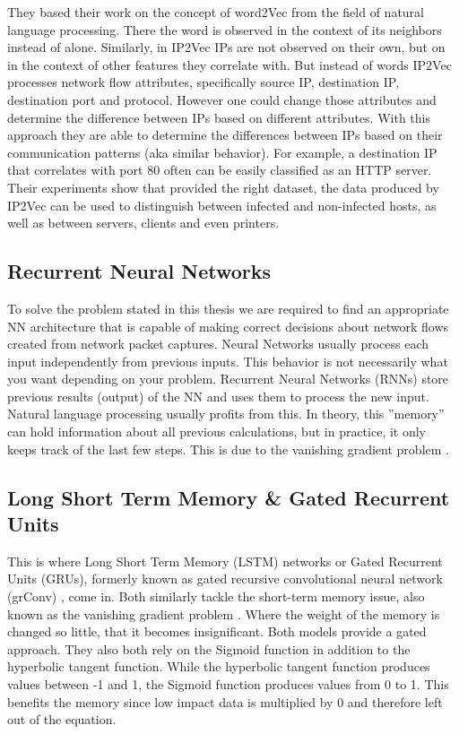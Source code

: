 \documentclass[
	ngerman,
	ruledheaders=section,%
	class=report,%
	thesis={type=bachelor},%
	accentcolor=9c,%
	custommargins=true,%
	marginpar=false,%
	parskip=half-,%
	fontsize=11pt,%
]{tudapub}
\begin{document}
They based their work on the concept of word2Vec from the field of natural language processing.
There the word is observed in the context of its neighbors instead of alone.
Similarly, in IP2Vec IPs are not observed on their own, but on in the context of other features they correlate with.
But instead of words IP2Vec processes network flow attributes,
specifically source IP, destination IP, destination port and protocol.
However one could change those attributes and determine the difference between IPs based on different attributes.
With this approach they are able to determine the differences between IPs based on their communication patterns (aka similar behavior).
For example, a destination IP that correlates with port 80 often can be easily classified as an HTTP server.
Their experiments show that provided the right dataset, the data produced by IP2Vec can be used to distinguish between infected and non-infected hosts, as well as between servers, clients and even printers.

\subsection{Recurrent Neural Networks}

To solve the problem stated in this thesis we are required to find an appropriate NN architecture
that is capable of making correct decisions about network flows created from network packet captures.
Neural Networks usually process each input independently from previous inputs.
This behavior is not necessarily what you want depending on your problem.
Recurrent Neural Networks (RNNs) store previous results (output) of the NN and uses them to process the new input.
Natural language processing usually profits from this.
In theory, this ''memory'' can hold information about all previous calculations,
but in practice, it only keeps track of the last few steps.
This is due to the vanishing gradient problem \cite{hochreiterLongShortTermMemory1997}.

\subsection{Long Short Term Memory \& Gated Recurrent Units}

This is where Long Short Term Memory (LSTM) networks \cite{hochreiterLongShortTermMemory1997} or Gated Recurrent Units (GRUs), formerly known as gated recursive convolutional neural network (grConv) \cite{bahdanauNeuralMachineTranslation2016}, come in.
Both similarly tackle the short-term memory issue,
also known as the vanishing gradient problem \cite{hochreiterLongShortTermMemory1997}.
Where the weight of the memory is changed so little, that it becomes insignificant.
Both models provide a gated approach.
They also both rely on the Sigmoid function in addition to the hyperbolic tangent function.
While the hyperbolic tangent function produces values between -1 and 1,
the Sigmoid function produces values from 0 to 1.
This benefits the memory since low impact data is multiplied by 0 and therefore left out of the equation.
\end{document}
